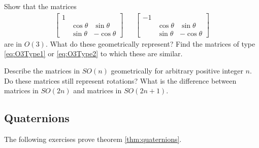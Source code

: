 \iffalse
\begin{exercise}
	\label{thm:exO(n)}
	What is wrong with the following proof?
	Suppose $A \in O(n)$ and let $v$ be an eigenvector of $A$ with eigenvalue $\lambda$ then
	\begin{alignat}{4}
		         &   & \innerp{Av}{Av}               & = \innerp{v}{v} \\
		\implies &   & \innerp{\lambda v}{\lambda v} & = \innerp{v}{v} \\
		\implies &   & \lambda^2 \innerp{v}{v}       & = \innerp{v}{v} \\
		\implies &   & \lambda^2                     & =  1
	\end{alignat}
	Hence every eigenvalue of $A$ is $\pm 1$.
\end{exercise}
\fi

\begin{exercise}
	Show that the matrices
	\begin{align}
		\begin{bmatrix} 1  &   &   \\ &\cos \theta & \sin \theta \\ &\sin \theta & -\cos \theta \end{bmatrix}
		&&
		\begin{bmatrix} -1 &   &   \\ &\cos \theta & \sin \theta \\ &\sin \theta & -\cos \theta \end{bmatrix}
	\end{align}
	are in $O(3)$. What do these geometrically represent? Find the matrices of type \eqref{eq:O3Type1} or \eqref{eq:O3Type2} to which these are similar.
\end{exercise}

\begin{exercise}
	Describe the matrices in $SO(n)$ geometrically for arbitrary positive integer $n$. Do these matrices still represent rotations? What is the difference between matrices in $SO(2n)$ and matrices in $SO(2n+1)$.
\end{exercise}

\subsection{Quaternions}
\label{sec:exQuaternions}
The following exercises prove theorem \ref{thm:quaternions}.

